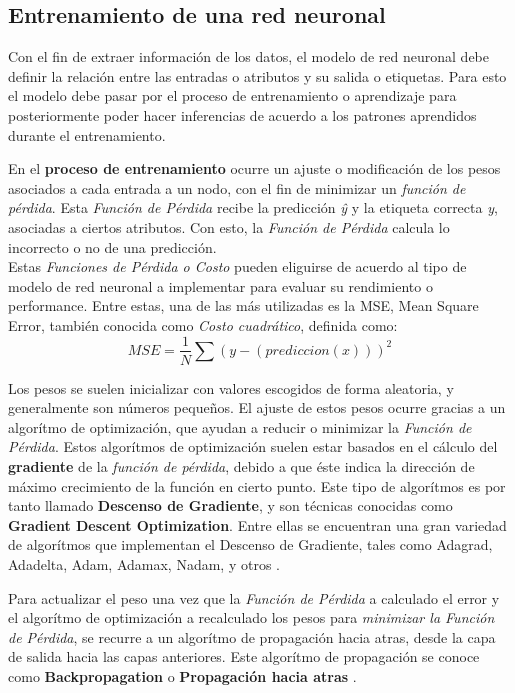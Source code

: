 \clearpage
\subsection{Entrenamiento de una red neuronal}

Con el fin de extraer información de los datos, el modelo de red neuronal debe definir la relación entre las entradas o atributos
y su salida o etiquetas. Para esto el modelo debe pasar por el proceso de entrenamiento o aprendizaje para posteriormente
poder hacer inferencias de acuerdo a los patrones aprendidos durante el entrenamiento.

En el \textbf{proceso de entrenamiento} ocurre un ajuste o modificación de los pesos asociados a cada entrada a un nodo,
con el fin de minimizar un \emph{función de pérdida}. Esta \emph{Función de Pérdida} recibe la predicción \emph{\^y} y la
etiqueta correcta \emph{y}, asociadas a ciertos atributos. Con esto, la \emph{Función de Pérdida} calcula lo incorrecto
o no de una predicción. \\
Estas \emph{Funciones de Pérdida o Costo} pueden eliguirse de acuerdo al tipo de modelo de red neuronal a implementar
para evaluar su rendimiento o performance. Entre estas, una de las más utilizadas es la MSE, Mean Square Error, también conocida
como \emph{Costo cuadrático}, definida como:
\begin{equation}
    MSE = \frac{1}{N}
        \sum (y - (prediccion(x)))^2
\end{equation}

Los pesos se suelen inicializar con valores escogidos de forma aleatoria, y generalmente
son números pequeños. El ajuste de estos pesos ocurre gracias a un algorítmo de optimización,
que ayudan a reducir o minimizar la \emph{Función de Pérdida}. Estos algorítmos de optimización suelen estar
basados en el cálculo del \textbf{gradiente} de la \emph{función de pérdida}, debido a que éste indica la dirección de
máximo crecimiento de la función en cierto punto. Este tipo de algorítmos es por tanto llamado
 \textbf{Descenso de Gradiente}, y son técnicas conocidas como \textbf{Gradient Descent Optimization}. Entre ellas
 se encuentran una gran variedad de algorítmos que implementan el Descenso de Gradiente, tales como Adagrad, Adadelta,
 Adam, Adamax, Nadam, y otros \cite{ruderOverviewGradientDescent2017}.

 Para actualizar el peso una vez que la \emph{Función de Pérdida} a calculado el error y el algorítmo de optimización
 a recalculado los pesos para \emph{minimizar la Función de Pérdida}, se recurre a un algorítmo de propagación hacia atras,
 desde la capa de salida hacia las capas anteriores. Este algorítmo de propagación se conoce como \textbf{Backpropagation}
 o \textbf{Propagación hacia atras} \cite{gershensonArtificialNeuralNetworks2003} \cite{epelbaumDeepLearningTechnical2017}.


